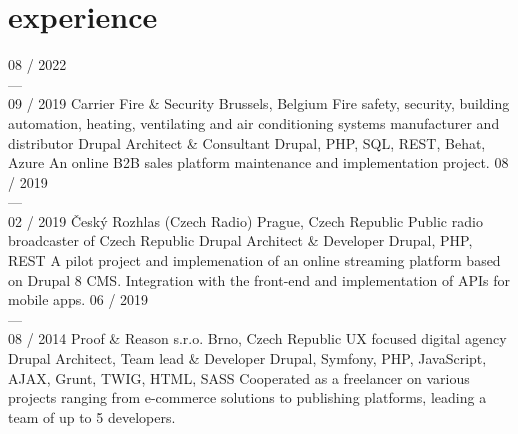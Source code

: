 \documentclass[]{friggeri-cv} %
\begin{document}

\bigskip

\section{experience}
\begin{entrylist}
  \job
  {08 / 2022 \\ --- \\ 09 / 2019}
  {Carrier Fire \& Security}
  {Brussels, Belgium}
  {Fire safety, security, building automation, heating, ventilating and air conditioning systems manufacturer and distributor}
  {
    \position
      {Drupal Architect \& Consultant}
      {Drupal, PHP, SQL, REST, Behat, Azure}
      {
        An online B2B sales platform maintenance and implementation project.
      }
  }
  \job
  {08 / 2019 \\ --- \\ 02 / 2019}
  {Český Rozhlas (Czech Radio)}
  {Prague, Czech Republic}
  {Public radio broadcaster of Czech Republic}
  {
    \position
      {Drupal Architect \& Developer}
      {Drupal, PHP, REST}
      {
        A pilot project and implemenation of an online streaming platform based on Drupal 8 CMS. Integration
        with the front-end and implementation of APIs for mobile apps.
      }
  }
  \job
  {06 / 2019 \\ --- \\ 08 / 2014}
  {Proof \& Reason s.r.o.}
  {Brno, Czech Republic}
  {UX focused digital agency}
  {
  \position
  {Drupal Architect, Team lead \& Developer}
  {Drupal, Symfony, PHP, JavaScript, AJAX, Grunt, TWIG, HTML, SASS}
  {
  Cooperated as a freelancer on various projects ranging from e-commerce solutions to publishing platforms, leading a team of up to 5 developers.
  }%
}
\end{entrylist}
\end{document}
